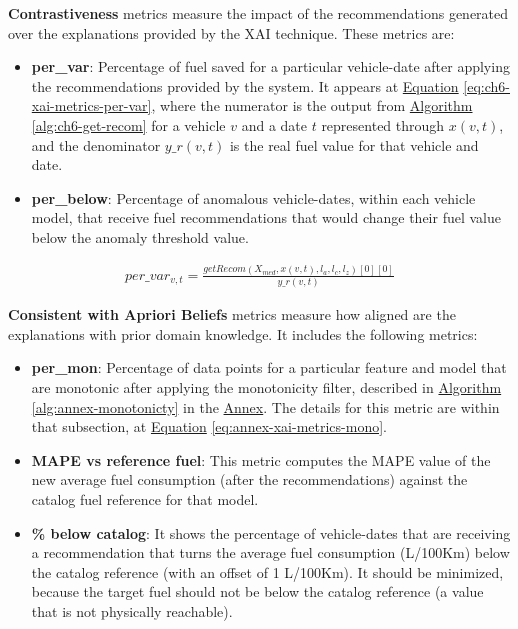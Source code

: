 \textbf{Contrastiveness} metrics measure the impact of the recommendations generated over the explanations provided by the XAI technique. These metrics are:
\begin{itemize}
    \item \textbf{per\_var}: Percentage of fuel saved for a particular vehicle-date after applying the recommendations provided by the system. It appears at \hyperref[eq:ch6-xai-metrics-per-var]{Equation} \ref{eq:ch6-xai-metrics-per-var}, where the numerator is the output from \hyperref[alg:ch6-get-recom]{Algorithm} \ref{alg:ch6-get-recom} for a vehicle $v$ and a date $t$ represented through $x(v,t)$, and the denominator $y\_r(v,t)$ is the real fuel value for that vehicle and date.
    \item \textbf{per\_below}: Percentage of anomalous vehicle-dates, within each vehicle model, that receive fuel recommendations that would change their fuel value below the anomaly threshold value.
\end{itemize}

\begin{equation}\label{eq:ch6-xai-metrics-per-var}
\begin{aligned}
per\_var_{v,t} = \frac{getRecom({X_{med}, x(v,t), l_a, l_c, l_z})[0][0]} {y\_r(v,t)}
\end{aligned}
\end{equation}

\textbf{Consistent with Apriori Beliefs} metrics measure how aligned are the explanations with prior domain knowledge. It includes the following metrics:
\begin{itemize}
    \item \textbf{per\_mon}: Percentage of data points for a particular feature and model that are monotonic after applying the monotonicity filter, described in \hyperref[alg:annex-monotonicty]{Algorithm} \ref{alg:annex-monotonicty} in the \hyperref[ch:annex]{Annex}. The details for this metric are within that subsection, at
    \hyperref[eq:annex-xai-metrics-mono]{Equation} \ref{eq:annex-xai-metrics-mono}.
    \item \textbf{MAPE vs reference fuel}: This metric computes the MAPE value of the new average fuel consumption (after the recommendations) against the catalog fuel reference for that model. 
    \item \textbf{\% below catalog}: It shows the percentage of vehicle-dates that are receiving a recommendation that turns the average fuel consumption (L/100Km) below the catalog reference (with an offset of 1 L/100Km). It should be minimized, because the target fuel should not be below the catalog reference (a value that is not physically reachable). 
\end{itemize}


